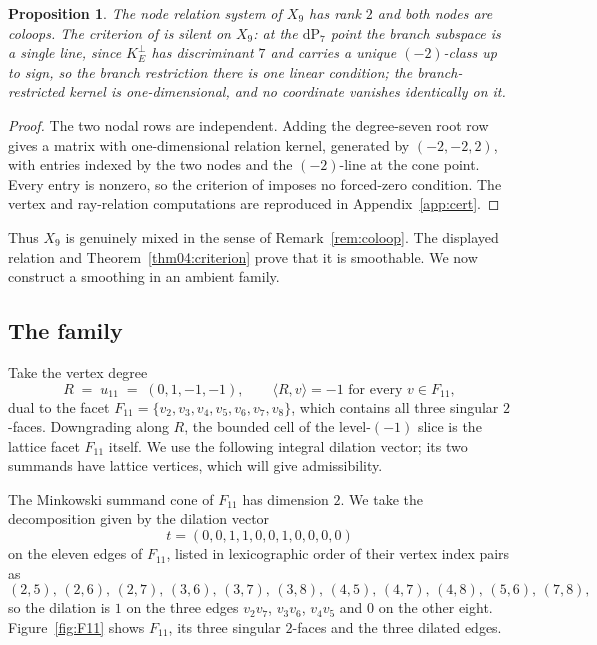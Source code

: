 \documentclass[11pt]{amsart}
\newtheorem{proposition}[theorem]{Proposition}
\theoremstyle{definition}
\theoremstyle{remark}
\theoremstyle{plain}
\newcommand{\dP}{\mathrm{dP}}
\begin{document}
\begin{proposition}\label{prop:mixed9}
The node relation system of $X_9$ has rank $2$ and both nodes are coloops.  The
criterion of \cite{PaperIV} is silent on $X_9$: at the $\dP_7$ point the branch
subspace is a single line, since $K_E^\perp$ has discriminant $7$ and carries a
unique $(-2)$-class up to sign, so the branch restriction there is one linear
condition; the branch-restricted kernel is one-dimensional, and no coordinate
vanishes identically on it.
\end{proposition}

\begin{proof}
The two nodal rows are independent.  Adding the degree-seven root
row gives a matrix with one-dimensional relation kernel, generated
by $(-2,-2,2)$, with entries indexed by the two nodes and the
$(-2)$-line at the cone point.  Every entry is nonzero, so the
criterion of \cite{PaperIV} imposes no forced-zero condition.
The vertex and ray-relation computations are reproduced in
Appendix~\ref{app:cert}.
\end{proof}

Thus $X_9$ is genuinely mixed in the sense of Remark~\ref{rem:coloop}.
The displayed relation and Theorem~\ref{thm04:criterion} prove that it
is smoothable.  We now construct a smoothing in an ambient family.

\subsection{The family}
Take the vertex degree
\[
  R \;=\; u_{11} \;=\; (0,1,-1,-1),
  \qquad \langle R,v\rangle=-1 \text{ for every } v \in F_{11},
\]
dual to the facet $F_{11} = \{v_2,v_3,v_4,v_5,v_6,v_7,v_8\}$, which contains all
three singular $2$-faces.  Downgrading along $R$, the bounded cell of the
level-$(-1)$ slice is the lattice facet $F_{11}$ itself.  We use the
following integral dilation vector; its two summands have lattice
vertices, which will give admissibility.

The Minkowski summand cone of $F_{11}$ has dimension $2$.  We take the decomposition
given by the dilation vector
\[
  t = (0,0,1,1,0,0,1,0,0,0,0)
\]
on the eleven edges of $F_{11}$, listed in lexicographic order of their vertex
index pairs as
\[
  (2,5),\,(2,6),\,(2,7),\,(3,6),\,(3,7),\,(3,8),\,(4,5),\,(4,7),\,(4,8),\,
  (5,6),\,(7,8),
\]
so the dilation is $1$ on the three edges $v_2v_7$, $v_3v_6$, $v_4v_5$ and $0$
on the other eight.  Figure~\ref{fig:F11} shows $F_{11}$, its three singular
$2$-faces and the three dilated edges.
\end{document}
